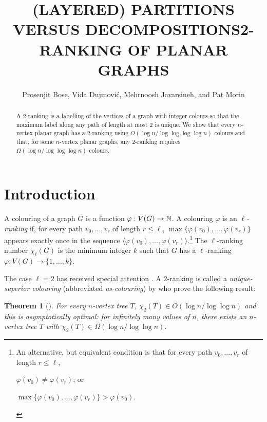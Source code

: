 \documentclass[kpfonts]{patmorin}
\title{\MakeUppercase{(Layered) Partitions versus Decompositions}}
\author{}
\title{\MakeUppercase{2-Ranking of Planar Graphs}}
\author{Prosenjit Bose, Vida Dujmović, Mehrnoosh Javarsineh, and Pat Morin}
\newcommand{\uqs}{\chi_2}
\newtheorem{othertheorem}{Theorem}
\theoremstyle{named}
\begin{document}
\begin{titlepage}
\maketitle

\begin{abstract}
  A 2-ranking is a labelling of the vertices of a graph with integer colours so that the maximum label along any path of length at most 2 is unique.  We show that every $n$-vertex planar graph has a 2-ranking using $O(\log n/\log\log\log\log n)$ colours and that, for some $n$-vertex planar graphs, any 2-ranking requires $\Omega(\log n/\log\log\log n)$ colours.
\end{abstract}
\end{titlepage}

\tableofcontents

\newpage
{}

\section{Introduction}


A colouring of a graph $G$ is a function $\varphi:V(G)\to \mathbb{N}$.  A colouring $\varphi$ is an \emph{$\ell$-ranking} if, for every path $v_0,\ldots,v_r$ of length $r\le\ell$, $\max\{\varphi(v_0),\ldots,\varphi(v_r)\}$ appears exactly once in the sequence $\langle \varphi(v_0),\ldots,\varphi(v_r)\rangle$.\footnote{An alternative, but equivalent condition is that for every path $v_0,\ldots,v_r$ of length $r\le\ell$,
\begin{inparaenum}[(i)]
   \item $\varphi(v_0)\neq \varphi(v_r)$; or
   \item $\max\{\varphi(v_0),\ldots,\varphi(v_r)\} > \varphi(v_0)$.
\end{inparaenum}
}
The $\ell$-ranking number $\chi_\ell(G)$ is the minimum integer $k$ such that $G$ has a $\ell$-ranking $\varphi:V(G)\to \{1,\ldots,k\}$.

The case $\ell=2$ has received special attention \cite{almeter.demircan.ea:graph,karpas.neiman.ea:on}. A $2$-ranking is called a \emph{unique-superior colouring} (abbreviated \emph{us-colouring}) by \citet{karpas.neiman.ea:on} who prove the following result:

\setcounter{othertheorem}{19}
\begin{othertheorem}[\cite{karpas.neiman.ea:on}]\label{trees}
    For every $n$-vertex tree $T$, $\uqs(T)\in O(\log n/\log\log n)$ and this is asymptotically optimal: for infinitely many values of $n$, there exists an $n$-vertex tree $T$ with $\uqs(T)\in\Omega(\log n/\log\log n)$.
\end{othertheorem}
\end{document}
